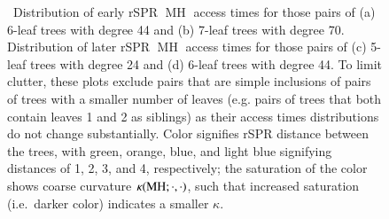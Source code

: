 \documentclass[]{elsarticle}
\let\MYoriglatexcaption\caption
\renewcommand{\caption}[2][\relax]{\MYoriglatexcaption[#2]{#2}}
\newcommand{\MH}{\operatorname{MH}}
\newcommand{\curvature}[2][]{%
    \ifthenelse{\equal{#1}{}}%
		{\kappa(#2)}%
		{\kappa_{#1}(#2)}%
}
\begin{document}
\begin{figure}
    \caption{\
        Distribution of early rSPR $\MH$ access times for those pairs of (a) 6-leaf trees with degree 44 and (b) 7-leaf trees with degree 70.
        Distribution of later rSPR $\MH$ access times for those pairs of (c) 5-leaf trees with degree 24 and (d) 6-leaf trees with degree 44.
				To limit clutter, these plots exclude pairs that are simple inclusions of pairs of trees with a smaller number of leaves (e.g. pairs of trees that both contain leaves 1 and 2 as siblings) as their access times distributions do not change substantially.
        Color signifies rSPR distance between the trees, with green, orange, blue, and light blue signifying distances of 1, 2, 3, and 4, respectively; the saturation of the color shows coarse curvature $\curvature{\MH; \cdot, \cdot}$, such that increased saturation (i.e.\ darker color) indicates a smaller $\kappa$.
        }
	\label{fig:kappa-access}
\end{figure}
\end{document}
